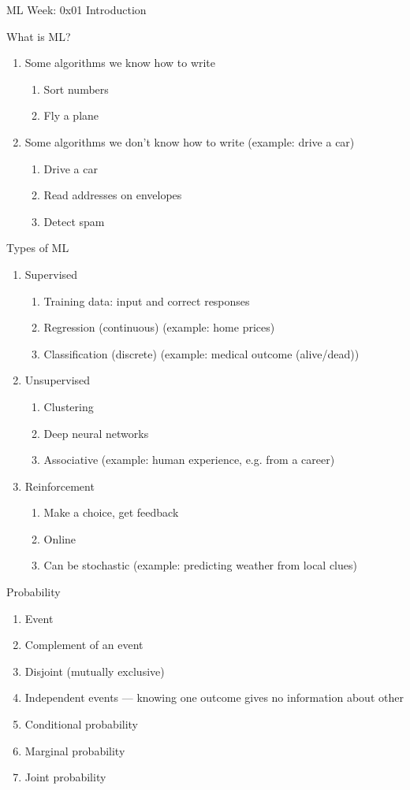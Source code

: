 \documentclass{report}
\begin{document}
\centerline{\large ML Week: 0x01 \hspace{2mm}  Introduction}
\vspace{10mm}

What is ML?
\begin{enumerate}
\item Some algorithms we know how to write
  \begin{enumerate}
  \item Sort numbers
  \item Fly a plane
  \end{enumerate}
\item Some algorithms we don't know how to write (example: drive a car)
  \begin{enumerate}
  \item Drive a car 
  \item Read addresses on envelopes
  \item Detect spam
  \end{enumerate}
\end{enumerate}

Types of ML
\begin{enumerate}
\item Supervised
  \begin{enumerate}
  \item Training data: input and correct responses
  \item Regression (continuous) (example: home prices)
  \item Classification (discrete) (example: medical outcome (alive/dead))
  \end{enumerate}
\item Unsupervised
  \begin{enumerate}
  \item Clustering
  \item Deep neural networks
  \item Associative (example: human experience, e.g. from a career)
  \end{enumerate}
\item Reinforcement
  \begin{enumerate}
  \item Make a choice, get feedback
  \item Online
  \item Can be stochastic (example: predicting weather from local clues)
  \end{enumerate}
\end{enumerate}

Probability
\begin{enumerate}
\item Event
\item Complement of an event
\item Disjoint (mutually exclusive)
\item Independent events --- knowing one outcome gives no information about other
\item Conditional probability
\item Marginal probability
\item Joint probability
\end{enumerate}
\end{document}
